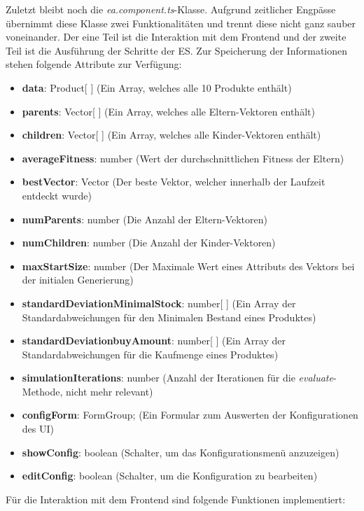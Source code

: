 \documentclass[]{scrartcl}
\begin{document}
Zuletzt bleibt noch die \textit{ea.component.ts}-Klasse. Aufgrund zeitlicher Engpässe übernimmt diese Klasse zwei Funktionalitäten und trennt diese nicht ganz sauber voneinander. Der eine Teil ist die Interaktion mit dem Frontend und der zweite Teil ist die Ausführung der Schritte der ES. Zur Speicherung der Informationen stehen folgende Attribute zur Verfügung:
\begin{itemize}
	\item \textbf{data}: Product[ ] (Ein Array, welches alle 10 Produkte enthält)
	\item \textbf{parents}: Vector[ ] (Ein Array, welches alle Eltern-Vektoren enthält)
	\item \textbf{children}: Vector[ ] (Ein Array, welches alle Kinder-Vektoren enthält)
	\item \textbf{averageFitness}: number (Wert der durchschnittlichen Fitness der Eltern)
	\item \textbf{bestVector}: Vector (Der beste Vektor, welcher innerhalb der Laufzeit entdeckt wurde)
	\item \textbf{numParents}: number (Die Anzahl der Eltern-Vektoren)
	\item \textbf{numChildren}: number (Die Anzahl der Kinder-Vektoren)
	\item \textbf{maxStartSize}: number (Der Maximale Wert eines Attributs des Vektors bei der initialen Generierung)
	\item \textbf{standardDeviationMinimalStock}: number[ ] (Ein Array der Standardabweichungen für den Minimalen Bestand eines Produktes)
	\item \textbf{standardDeviationbuyAmount}: number[ ] (Ein Array der Standardabweichungen für die Kaufmenge eines Produktes)
	\item \textbf{simulationIterations}: number (Anzahl der Iterationen für die \textit{evaluate}-Methode, nicht mehr relevant)
	\item \textbf{configForm}: FormGroup; (Ein Formular zum Auswerten der Konfigurationen des UI)
	\item \textbf{showConfig}: boolean (Schalter, um das Konfigurationsmenü anzuzeigen)
	\item \textbf{editConfig}: boolean (Schalter, um die Konfiguration zu bearbeiten)
\end{itemize}

Für die Interaktion mit dem Frontend sind folgende Funktionen implementiert:
\end{document}
